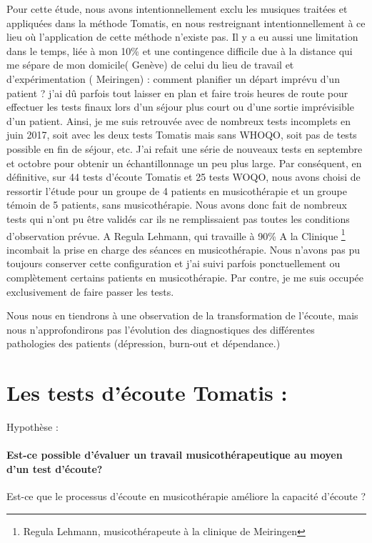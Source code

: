  Pour cette étude, nous avons intentionnellement exclu les musiques traitées et appliquées dans la méthode Tomatis, en nous restreignant  intentionnellement à ce lieu où l'application de cette méthode n'existe pas. Il y a eu aussi une limitation dans le temps, liée à mon 10\% et  une contingence difficile due à la distance qui me sépare de mon domicile( Genève) de celui  du lieu de travail et d'expérimentation ( Meiringen) : comment planifier un départ imprévu d'un patient ? j'ai dû parfois tout laisser en plan et faire  trois heures de route pour effectuer  les tests finaux lors d'un séjour plus court ou d'une sortie imprévisible d'un patient. Ainsi,  je me suis retrouvée avec de nombreux tests incomplets en juin 2017, soit avec les deux tests Tomatis mais sans WHOQO, soit pas de tests possible en fin de séjour, etc. 	J'ai refait une série de nouveaux tests en septembre et octobre pour obtenir un échantillonnage un peu plus large. Par conséquent, en définitive, sur 44 tests d'écoute Tomatis et 25 tests WOQO, nous avons choisi de ressortir  l'étude pour  un groupe de 4 patients en musicothérapie et un groupe témoin de 5 patients, sans musicothérapie. Nous avons donc fait de nombreux tests qui n'ont pu être validés car ils ne remplissaient pas toutes les conditions d'observation prévue.
 A Regula Lehmann, qui travaille à 90\%
 A la Clinique \footnote{Regula Lehmann, musicothérapeute à la clinique de Meiringen}
 incombait la prise en charge des séances en musicothérapie. Nous n'avons pas pu toujours conserver cette configuration et j'ai suivi parfois ponctuellement ou complètement certains patients en musicothérapie. Par contre,   je me suis occupée exclusivement  de faire passer les tests.
 
 Nous nous en tiendrons à une observation de la transformation de l'écoute, mais nous n'approfondirons pas l'évolution des diagnostiques des différentes pathologies des patients 
  (dépression,  burn-out et dépendance.)

\section{Les tests d'écoute Tomatis : }
{Hypothèse :}

\paragraph{Est-ce possible d'évaluer un travail musicothérapeutique au moyen
d'un test d'écoute?}

Est-ce que le processus d'écoute en musicothérapie améliore la capacité
d'écoute ?

